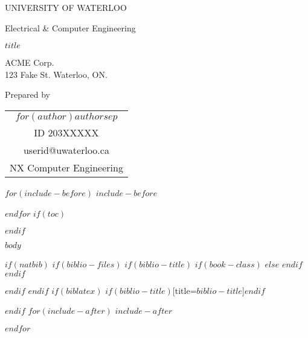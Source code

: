 \documentclass[$if(fontsize)$$fontsize$,$endif$$if(lang)$$lang$,$endif$]{$documentclass$}
\date{$date$}
\makeatletter
\renewcommand{\maketitle}{%
  \begin{titlepage}
  \begin{singlespacing}
  \let\footnotesize\small
  \let\footnoterule\relax
  \let\footnote\thanks
  \begin{center}
    {\large \MakeTextUppercase{University of Waterloo} \par Electrical \& Computer Engineering}%
  \end{center}
  \null\vfill
  \begin{center}
      {\LARGE  \par}{\huge \MakeTextUppercase{$title$} \par}%
  \end{center}\par
  \null\vfill
  \begin{center}
    {\large ACME Corp.\\ 123 Fake St. Waterloo, ON.}
  \end{center}\par
  \null\vfill
  \begin{center}
    \large Prepared by\\
      \begin{tabular}[t]{c}
        $for(author)$$author$$sep$ \and $endfor$ \\
          ID 203XXXXX \\ userid@uwaterloo.ca\\ NX Computer Engineering
      \end{tabular}
      \par
    \date{$date$}
  \end{center}
  \end{singlespacing}
  \end{titlepage}
}
\makeatother
\begin{document}
\maketitle
\thispagestyle{empty}

\setcounter{page}{1}

$for(include-before)$
$include-before$

$endfor$
$if(toc)$
{
\hypersetup{linkcolor=black}
\tableofcontents
\pagebreak

\listoffigures
{}
\pagebreak

\listoftables
{}
\pagebreak

}
$endif$

\setcounter{page}{1}
$body$

$if(natbib)$
$if(biblio-files)$
$if(biblio-title)$
$if(book-class)$
\renewcommand\bibname{$biblio-title$}
$else$
\renewcommand\refname{$biblio-title$}
$endif$
$endif$



$endif$
$endif$
$if(biblatex)$
\pagebreak
\printbibliography$if(biblio-title)$[title=$biblio-title$]$endif$

$endif$
$for(include-after)$
$include-after$

$endfor$
\end{document}
